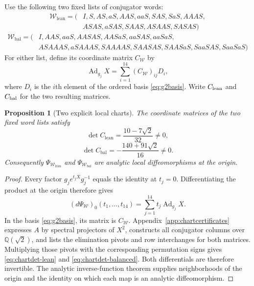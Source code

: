 \documentclass[11pt,a4paper]{article}
\newtheorem{proposition}[proposition]{Proposition}
\newcommand{\Ad}{\operatorname{Ad}}
\begin{document}
Use the following two fixed lists of conjugator words:
\begin{align*}
\mathcal W_{\mathrm{lean}}=(&I,S,AS,aS,AAS,aaS,SAS,SaS,AAAS,\\
&ASAS,aSAS,SAAS,ASAAS,SASAS)
\end{align*}
\begin{align*}
\mathcal W_{\mathrm{bal}}=(&I,AAS,aaS,AASAS,AASaS,aaSAS,aaSaS,\\
&ASAAAS,aSAAAS,SAAAAS,SAASAS,SAASaS,SaaSAS,SaaSaS)
\end{align*}
For either list, define its coordinate matrix $C_{\mathcal W}$ by
\[
\Ad_{g_j}X=\sum_{i=1}^{14}(C_{\mathcal W})_{ij}D_i,
\]
where $D_i$ is the $i$th element of the ordered basis \eqref{eq:g2basis}.
Write $C_{\rm lean}$ and $C_{\rm bal}$ for the two resulting matrices.

\begin{proposition}[Two explicit local charts]
\label{thm:charts}
The coordinate matrices of the two fixed word lists satisfy
\begin{equation}
\det C_{\mathrm{lean}}=\frac{10-7\sqrt2}{32}\ne0,
\label{eq:chartdet-lean}
\end{equation}
\begin{equation}
\det C_{\mathrm{bal}}=-\frac{140+91\sqrt2}{16}\ne0.
\label{eq:chartdet-balanced}
\end{equation}
Consequently $\Psi_{\mathcal W_{\mathrm{lean}}}$ and
$\Psi_{\mathcal W_{\mathrm{bal}}}$ are analytic local diffeomorphisms at the origin.
\end{proposition}

\begin{proof}
Every factor $g_j e^{t_jX}g_j^{-1}$ equals the identity at $t_j=0$.
Differentiating the product at the origin therefore gives
\[
(d\Psi_{\mathcal W})_0(t_1,\ldots,t_{14})
=\sum_{j=1}^{14}t_j\Ad_{g_j}X.
\]
In the basis \eqref{eq:g2basis}, its matrix is $C_{\mathcal W}$.
Appendix~\ref{app:chartcertificates} expresses $A$ by spectral projectors of
$X^2$, constructs all conjugator columns over $\mathbb Q(\sqrt2)$, and lists
the elimination pivots and row interchanges for both matrices.  Multiplying
those pivots with the corresponding permutation signs gives
\eqref{eq:chartdet-lean} and \eqref{eq:chartdet-balanced}.
Both differentials are therefore invertible.  The analytic inverse-function
theorem supplies neighborhoods of the origin and the identity on which each
map is an analytic diffeomorphism.
\end{proof}
\end{document}
